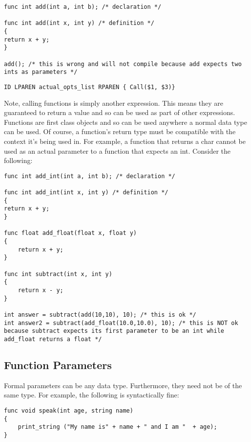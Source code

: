 \documentclass{article}
\begin{document}
\begin{lstlisting}
func int add(int a, int b); /* declaration */

func int add(int x, int y) /* definition */
{
return x + y;
}

add(); /* this is wrong and will not compile because add expects two ints as parameters */

\end{lstlisting}

\begin{Verbatim}[frame=single]
	 ID LPAREN actual_opts_list RPAREN { Call($1, $3)}
\end{Verbatim}

Note, calling functions is simply another expression. This means they are guaranteed to return a value and so can be used as part of other expressions.
Functions are first class objects and so can be used anywhere a normal data type can be used. Of course, a function's return type must be compatible with the context it's being used in. For example, a function that returns a char cannot be used as an actual parameter to a function that expects an int.  Consider the following:

\begin{lstlisting}
func int add_int(int a, int b); /* declaration */

func int add_int(int x, int y) /* definition */
{
return x + y;
}

func float add_float(float x, float y)
{
	return x + y;
}

func int subtract(int x, int y)
{
	return x - y;
}

int answer = subtract(add(10,10), 10); /* this is ok */
int answer2 = subtract(add_float(10.0,10.0), 10); /* this is NOT ok because subtract expects its first parameter to be an int while add_float returns a float */

\end{lstlisting}

\subsection{Function Parameters}
Formal parameters can be any data type. Furthermore, they need not be of the same type. For example, the following is syntactically fine:

\begin{lstlisting}
func void speak(int age, string name)
{
	print_string ("My name is" + name + " and I am "  + age);
}
\end{lstlisting}
\end{document}
